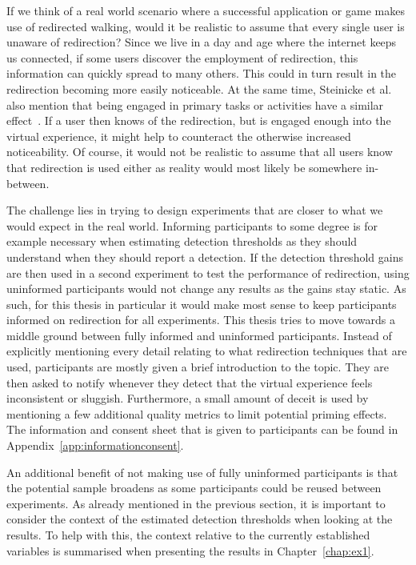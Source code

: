 If we think of a real world scenario where a successful application or game makes use of redirected walking, would it be realistic to assume that every single user is unaware of redirection? Since we live in a day and age where the internet keeps us connected, if some users discover the employment of redirection, this information can quickly spread to many others. This could in turn result in the redirection becoming more easily noticeable. At the same time, Steinicke et al. also mention that being engaged in primary tasks or activities have a similar effect~\cite{5072212}. If a user then knows of the redirection, but is engaged enough into the virtual experience, it might help to counteract the otherwise increased noticeability. Of course, it would not be realistic to assume that all users know that redirection is used either as reality would most likely be somewhere in-between. 
 
The challenge lies in trying to design experiments that are closer to what we would expect in the real world. Informing participants to some degree is for example necessary when estimating detection thresholds as they should understand when they should report a detection. If the detection threshold gains are then used in a second experiment to test the performance of redirection, using uninformed participants would not change any results as the gains stay static. As such, for this thesis in particular it would make most sense to keep participants informed on redirection for all experiments. This thesis tries to move towards a middle ground between fully informed and uninformed participants. Instead of explicitly mentioning every detail relating to what redirection techniques that are used, participants are mostly given a brief introduction to the topic. They are then asked to notify whenever they detect that the virtual experience feels inconsistent or sluggish. Furthermore, a small amount of deceit is used by mentioning a few additional quality metrics to limit potential priming effects. The information and consent sheet that is given to participants can be found in Appendix~\ref{app:informationconsent}.

An additional benefit of not making use of fully uninformed participants is that the potential sample broadens as some participants could be reused between experiments. As already mentioned in the previous section, it is important to consider the context of the estimated detection thresholds when looking at the results. To help with this, the context relative to the currently established variables is summarised when presenting the results in Chapter~\ref{chap:ex1}. 

